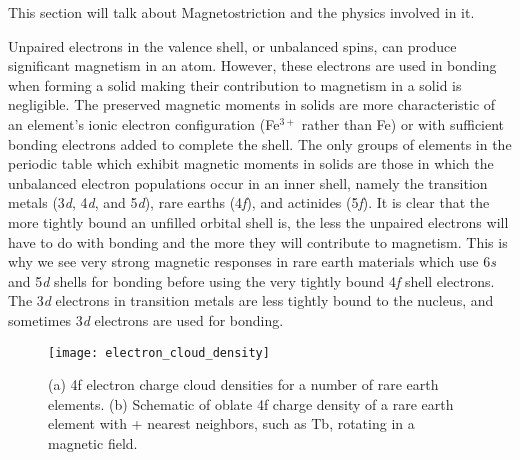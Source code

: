 \documentclass[../Thesis_Proposal_Outline.tex]{subfiles}
\begin{document}
	This section will talk about Magnetostriction and the physics involved in it. 
	
	Unpaired electrons in the valence shell, or unbalanced spins, can produce significant magnetism in an atom.  However, these electrons are used in bonding when forming a solid making their contribution to magnetism in a solid is negligible\cite{Breu2008}.  The preserved magnetic moments in solids are more characteristic of an element’s ionic electron configuration (Fe{$^{3+}$} rather than Fe) or with sufficient bonding electrons added to complete the shell.  The only groups of elements in the periodic table which exhibit magnetic moments in solids are those in which the unbalanced electron populations occur in an inner shell, namely the transition metals (3\textit{d}, 4\textit{d}, and 5\textit{d}), rare earths (4\textit{f}), and actinides (5\textit{f}).  It is clear that the more tightly bound an unfilled orbital shell is, the less the unpaired electrons will have to do with bonding and the more they will contribute to magnetism.  This is why we see very strong magnetic responses in rare earth materials which use 6\textit{s} and 5\textit{d} shells for bonding before using the very tightly bound 4\textit{f} shell electrons.  The 3\textit{d} electrons in transition metals are less tightly bound to the nucleus, and sometimes 3\textit{d} electrons are used for bonding.  \\
	
	\begin{figure}[h] 
		\centering
		\texttt{[image: electron\_cloud\_density]}
		\caption{(a) 4f electron charge cloud densities for a number of rare earth elements. (b) Schematic of oblate 4f charge density of a rare earth element with + nearest neighbors, such as Tb, rotating in a magnetic field. \cite{Engdahl1999} 
		}
		\label{fig:electron_cloud_density}		
	\end{figure}
	
\end{document}
